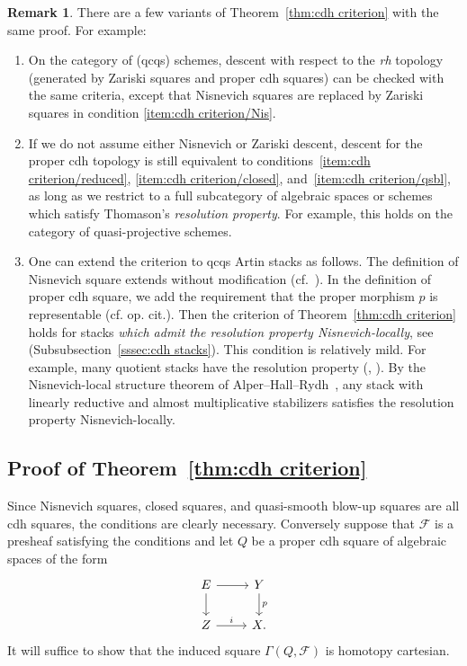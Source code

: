 \documentclass[11pt]{article}
\theoremstyle{definition}
\newtheorem{rema}[theo]{Remark}
\numberwithin{equation}{section}
\numberwithin{figure}{section}
\numberwithin{table}{section}
\newcommand{\sF}{\ensuremath{\mathcal{F}}\xspace}
\newcommand*{\romanenumi}{\renewcommand*{\theenumi}{\roman{enumi}}}
\begin{document}
\begin{rema}\label{rem:variants of cdh criterion}
There are a few variants of Theorem~\ref{thm:cdh criterion} with the same proof. For example:
\begin{enumerate}\romanenumi
\item On the category of (qcqs) schemes, descent with respect to the \emph{rh} topology (generated by Zariski squares and proper cdh squares) can be checked with the same criteria, except that Nisnevich squares are replaced by Zariski squares in condition
\eqref{item:cdh criterion/Nis}.
\item If we do not assume either Nisnevich or Zariski descent, descent for the proper cdh topology is still equivalent to conditions~\eqref{item:cdh criterion/reduced},
\eqref{item:cdh criterion/closed}, and~\eqref{item:cdh criterion/qsbl}, as long as we restrict to a full subcategory of algebraic spaces or schemes which satisfy Thomason's \emph{resolution property}. For example, this holds on the category of quasi-projective schemes.
\item \label{item:variants of cdh criterion/stacks}
One can extend the criterion to qcqs Artin stacks as follows. The definition of Nisnevich square extends without modification (cf.~\cite[Subsection~2.3]{HoyoisKrishna}). In the definition of proper cdh square, we add the requirement that the proper morphism $p$ is representable (cf. op. cit.). Then the criterion of Theorem~\ref{thm:cdh criterion} holds for stacks \emph{which admit the resolution property Nisnevich-locally}, see (Subsubsection~\ref{sssec:cdh stacks}). This condition is relatively mild. For example, many quotient stacks have the resolution property (\cite[Lemma~2.4]{ThomasonEquivariant}, \cite[Example~7.5]{HallRydhPerfect}). By the Nisnevich-local structure theorem of Alper--Hall--Rydh~\cite[Theorem~2.9]{HoyoisKrishna}, any stack with linearly reductive and almost multiplicative stabilizers satisfies the resolution property Nisnevich-locally.
\end{enumerate}
\end{rema}

\subsection{Proof of Theorem~\ref{thm:cdh criterion}}

Since Nisnevich squares, closed squares, and quasi-smooth blow-up squares are all cdh squares, the conditions are clearly necessary. Conversely suppose that $\sF$ is a presheaf satisfying the conditions and let $Q$ be a proper cdh square of algebraic spaces of the form
\begin{equation}\label{eq:proper cdh in proof}
\begin{tikzcd}
E \ar{r}\ar{d} & Y \ar{d}{p}
\\
Z \ar{r}{i} & X.
\end{tikzcd}
\end{equation}
It will suffice to show that the induced square $\Gamma(Q, \sF)$ is homotopy cartesian.
\end{document}
